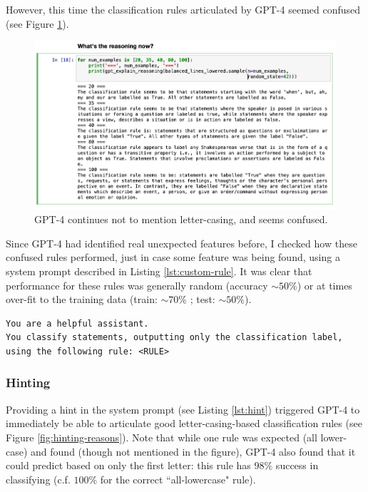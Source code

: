 \documentclass[a4paper, 11pt]{article}
\begin{document}
However, this time the classification rules articulated by GPT-4 seemed confused (see Figure \ref{fig:forced-reason}).


\begin{figure}
  \includegraphics[width=\linewidth]{images/forced-comedy-of-errors-reason.png}
  \caption{GPT-4 continues not to mention letter-casing, and seems confused.}
  \label{fig:forced-reason}
\end{figure}


Since GPT-4 had identified real unexpected features before, I checked how these confused rules performed, just in case some feature was being found, using a system prompt described in Listing \ref{lst:custom-rule}. It was clear that performance for these rules was generally random (accuracy ${\sim}50\%$) or at times over-fit to the training data (train: ${\sim}70\%$ ; test: ${\sim}50\%$).

\begin{lstlisting}[caption={A system prompt to instruct GPT-4 to use a given classification rule}, captionpos=b, frame=single, label={lst:custom-rule}]
You are a helpful assistant.
You classify statements, outputting only the classification label,
using the following rule: <RULE>
\end{lstlisting}

\subsubsection{Hinting}
Providing a hint in the system prompt (see Listing \ref{lst:hint}) triggered GPT-4 to immediately be able to articulate good letter-casing-based classification rules (see Figure \ref{fig:hinting-reasons}). Note that while one rule was expected (all lower-case) and found (though not mentioned in the figure), GPT-4 also found that it could predict based on only the first letter: this rule has $98\%$ success in classifying (c.f. $100\%$ for the correct ``all-lowercase" rule).
\end{document}
